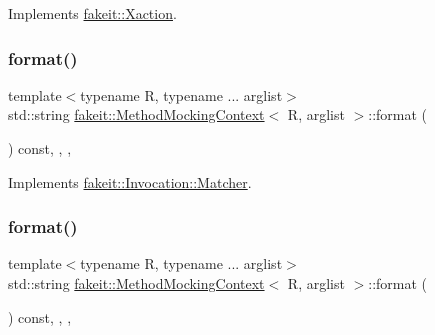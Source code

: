 Implements \mbox{\hyperlink{structfakeit_1_1Xaction_a4822c4b2af0477ae8271a021874224c0}{fakeit\+::\+Xaction}}.

\mbox{\label{classfakeit_1_1MethodMockingContext_a0e71b77ab7f91d629a5853542d48624a}} 
\subsubsection{\texorpdfstring{format()}{format()}\hspace{0.1cm}{\footnotesize\ttfamily [1/9]}}
{\footnotesize\ttfamily template$<$typename R, typename ... arglist$>$ \\
std\+::string \mbox{\hyperlink{classfakeit_1_1MethodMockingContext}{fakeit\+::\+Method\+Mocking\+Context}}$<$ R, arglist $>$\+::format (\begin{DoxyParamCaption}{ }\end{DoxyParamCaption}) const\hspace{0.3cm}{\ttfamily [inline]}, {\ttfamily [override]}, {\ttfamily [protected]}, {\ttfamily [virtual]}}



Implements \mbox{\hyperlink{structfakeit_1_1Invocation_1_1Matcher_af570f2942a21d89cb3a09889bd9ac6f2}{fakeit\+::\+Invocation\+::\+Matcher}}.

\mbox{\label{classfakeit_1_1MethodMockingContext_a0e71b77ab7f91d629a5853542d48624a}} 
\subsubsection{\texorpdfstring{format()}{format()}\hspace{0.1cm}{\footnotesize\ttfamily [2/9]}}
{\footnotesize\ttfamily template$<$typename R, typename ... arglist$>$ \\
std\+::string \mbox{\hyperlink{classfakeit_1_1MethodMockingContext}{fakeit\+::\+Method\+Mocking\+Context}}$<$ R, arglist $>$\+::format (\begin{DoxyParamCaption}{ }\end{DoxyParamCaption}) const\hspace{0.3cm}{\ttfamily [inline]}, {\ttfamily [override]}, {\ttfamily [protected]}, {\ttfamily [virtual]}}



